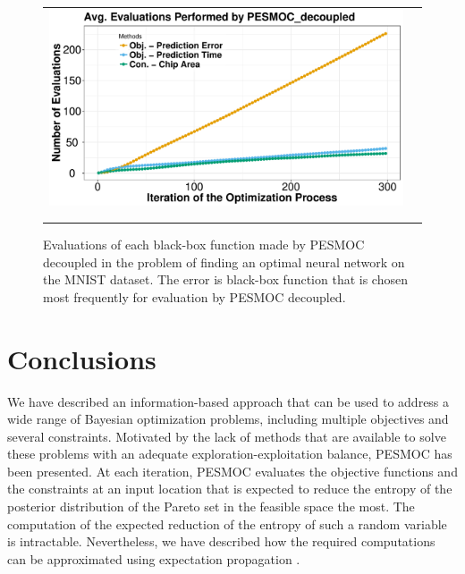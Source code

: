 \documentclass[review,preprint,12pt]{elsarticle}
\begin{document}
\begin{figure}[htb]
\begin{center}
        \begin{tabular}{cc}
                \vspace{-.2cm}
                \includegraphics[width=0.75\linewidth]{figures/real/plot_rrnn_counter.pdf} \\ \\
                \vspace{-.1cm}
        \end{tabular}
        \caption{Evaluations of each black-box function made by PESMOC decoupled in the problem of finding an optimal
	neural network on the MNIST dataset. The error is black-box function that is chosen most frequently for evaluation 
	by PESMOC decoupled.} 
        \label{fig:nnet_counter}
\end{center}
\end{figure}

\section{Conclusions}
\label{sec:conclusions}

We have described an information-based approach that can
be used to address a wide range of Bayesian optimization problems,
including multiple objectives and several constraints.
Motivated by the lack of methods that are available to solve these
problems with an adequate exploration-exploitation balance,
PESMOC has been presented. At each iteration, PESMOC
evaluates the objective functions and the constraints at an input
location that is expected to reduce the entropy of the posterior
distribution of the Pareto set in the feasible space the most. The 
computation of the expected reduction of the entropy of such a random variable is
intractable. Nevertheless,  we have described how the required computations can 
be approximated using expectation propagation \citep{minka2001expectation}.
\end{document}
